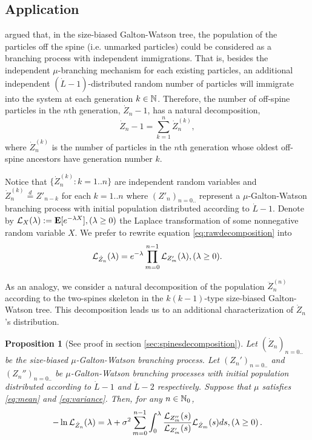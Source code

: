 \documentclass[12pt]{amsart}
\newtheorem{prop}[thm]{Proposition}
\theoremstyle{remark}
\numberwithin{equation}{section}
\newcommand{\expr}[1]{\left( #1 \right)}
\newcommand{\eqlaw}{\overset{d}{=}}
\newcommand{\bE}{\mathbf E}\newcommand{\bbE}{\mathbb E}\newcommand{\cE}{\mathcal E}
\begin{document}
\subsection{Application}	
	\citet*{lyons1995conceptual} argued that, in the size-biased Galton-Watson tree, the population of the particles off the spine (i.e. unmarked particles) could be considered as a branching process with independent immigrations. That is, besides the independent $\mu$-branching mechanism for each existing particles, an additional independent $(\dot L-1)$-distributed random number of particles will immigrate into the system at each generation $k\in\mathbb N$. Therefore, the number of off-spine particles in the $n$th generation, $\dot Z_n-1$, has a natural decomposition,
\begin{equation}
\label{eq:rawdecomposition}
		\dot Z_n-1
	=
		\sum_{k=1}^{n}\dot Z_n^{(k)},
\end{equation}
	where $\dot Z^{(k)}_n$ is the number of particles in the $n$th generation whose oldest off-spine ancestors have generation number $k$. 
\par	
	Notice that $\{\dot Z_n^{(k)}: k=1..n\}$ are independent random variables and $\dot Z_n^{(k)}\eqlaw Z'_{n-k}$ for each $k=1..n$ where $(Z'_n)_{n=0..}$ represent a $\mu$-Galton-Watson branching process with initial population distributed according to $\dot L-1$. Denote by $\cL_X(\lambda):=\bE[e^{-\lambda X}],(\lambda \geq 0)$ the Laplace  transformation of some nonnegative random variable $X$. We prefer to rewrite equation \eqref{eq:rawdecomposition} into
\begin{equation}
\label{eq:spinedecomposition}
		\mathcal L_{\dot Z_n}(\lambda)
	=
		e^{-\lambda}\prod_{m=0}^{n-1} \mathcal L_{Z'_m}(\lambda)
	,(\lambda \geq 0).
\end{equation}
\par
	 As an analogy, we consider a natural decomposition of the population $\ddot Z_n^{(n)}$ according to the two-spines skeleton in the $k(k-1)$-type size-biased Galton-Watson tree. This decomposition leads us to an additional characterization of $\dot Z_n$'s distribution.
\begin{prop}[See proof in section \ref{sec:spinesdecomposition}]
\label{lem:twospinedecomposition}
	Let $(\dot Z_n)_{n=0..}$ be the size-biased $\mu$-Galton-Watson branching process. Let $(Z_n')_{n=0..}$ and $(Z_n'')_{n=0..}$ be $\mu$-Galton-Watson branching processes with initial population distributed according to $\dot L-1$ and $\ddot L-2$ respectively. Suppose that $\mu$ satisfies \eqref{eq:mean} and \eqref{eq:variance}. Then, for any $n\in \mathbb N_0$,
\begin{equation}
\label{eq:twospinedecomposition}
		-\ln \cL_{\dot Z_n}(\lambda)
	=
		\lambda+\sigma^2\sum_{m=0}^{n-1}\int_0^\lambda \frac{\cL_{Z''_m}(s)}{\cL_{Z'_m}(s)}\cL_{\dot Z_m}(s)ds 
	,\expr{\lambda \geq 0}.
\end{equation}
\end{prop}
\end{document}
